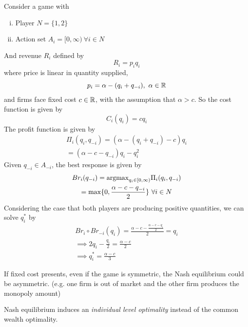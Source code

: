 \documentclass[11pt]{article}
\begin{document}
		\begin{example}
			Consider a game with
			\begin{enumerate}[i)]
				\item Player $N = \{1,2\}$
				\item Action set $A_i = [0, \infty)\ \forall i \in N$
			\end{enumerate}
			And revenue $R_i$ defined by 
			\begin{equation}
				R_i = p_i q_i
			\end{equation}
			where price is linear in quantity supplied,
			\begin{equation}
				p_i = \alpha - (q_i + q_{-i}),\ \alpha \in \mathbb{R}
			\end{equation}
			and firms face fixed cost $c \in \mathbb{R}$, with the assumption that $\alpha > c$. So the cost function is given by
			\begin{equation}
				C_i(q_i) = c q_i 
			\end{equation}
			The profit function is given by
			\begin{gather}
				\Pi_i(q_i, q_{-i}) = (\alpha - (q_i + q_{-i}) - c) q_i \\
				= (\alpha-c-q_{-i})q_i - q_i^2
			\end{gather}
			Given $q_{-i} \in A_{-i}$, the best response is given by
			\begin{gather}
				Br_i(q_{-i}) = \text{{argmax}}_{q_i \in [0, \infty)} \Pi_i(q_i, q_{-i}) \\
				= \max\{0, \frac{\alpha - c - q_{-i}}{2}\}\ \forall i \in N
			\end{gather}
			Considering the case that both players are producing positive quantities, we can solve $q_i^*$ by
			\begin{gather}
				Br_i \circ Br_{-i}(q_i) = \frac{\alpha - c - \frac{\alpha - c - q_i}{2}}{2} = q_i \\
				\implies 2 q_i - \frac{q_i}{2} = \frac{\alpha - c}{2} \\
				\implies q_i^* = \frac{\alpha - c}{3}
			\end{gather}
			
			\begin{remark}
				If fixed cost presents, even if the game is symmetric, the Nash equilibrium could be asymmetric. (e.g. one firm is out of market and the other firm produces the monopoly amount)
			\end{remark}
		\end{example}
		
		\begin{remark}
			Nash equilibrium induces an \emph{individual level optimality} instead of the common wealth optimality.
		\end{remark}
		
\end{document}
